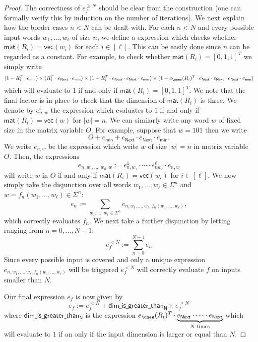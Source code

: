 \begin{proof}
The correctness of $e_f^{\geq N}$ should be clear from the construction (one can formally verify this by
induction on the number of iterations). We next explain how the border cases $n<N$ can be dealt with.
For each $n<N$ and every possible input words
$w_1,\ldots,w_\ell$ of size $n$, we define a \langfor expression which checks whether
$\mathsf{mat}(R_i)=\mathsf{vec}(w_i)$ for each $i\in[\ell]$. This can be easily done since $n$ 
can be regarded as a constant. For example, to check whether $\mathsf{mat}(R_i)=[0,1,1]^T$ we simply write
$$
(1- R_i^T\cdot e_{\mathsf{min}})\times (R_i^T\cdot e_{\mathsf{Next}}\cdot e_{\mathsf{min}})\times (1- R_i^T\cdot e_{\mathsf{Next}}\cdot e_{\mathsf{Next}}\cdot e_{\mathsf{min}})\times (1- e_{\ones}(R_i)^T\cdot e_{\mathsf{Next}}\cdot e_{\mathsf{Next}}\cdot e_{\mathsf{Next}}\cdot e_{\mathsf{min}})
$$
which will evaluate to $1$ if and only if $\mathsf{mat}(R_i)=[0,1,1]^T$. We note that the final factor is in 
place to check that the dimension of $\mathsf{mat}(R_i)$ is three.
  We denote by
$e_{n,w}^i$ the expression which evaluates to $1$ if and only if $\mathsf{mat}(R_i)=\mathsf{vec}(w)$
for $|w|=n$.
We can similarly
write any word $w$ of fixed size in the matrix variable $O$. For example, suppose that $w=101$
then we write 
$$
O+ e_{\mathsf{min}}+  e_{\mathsf{Next}}\cdot e_{\mathsf{Next}}\cdot e_{\mathsf{min}}.
$$
We write $e_{n,w}$ be the expression which write $w$ of size $|w|=n$ in matrix variable $O$.
Then, the expressions
$$
e_{n,w_1,\ldots,w_n,w}:=e_{n,w_1}^1\cdot\cdots\cdot e_{nw_{\ell}}^\ell\cdot e_{n,w}
$$
will write $w$ in $O$ if and only if $\mathsf{mat}(R_i)=\mathsf{vec}(w_i)$ for $i\in[\ell]$.
We now simply take the disjunction over all words 
$w_1,\ldots,w_\ell\in\Sigma^n$ and $w=f_n(w_1,\ldots,w_\ell)\in\Sigma^n$:
$$
e_n:=\sum_{w_1,\ldots,w_\ell\in\Sigma^n} e_{n,w_1,\ldots,w_\ell,f_n(w_1,\ldots,w_\ell)},
$$
which correctly evaluates $f_n$. We next take a further disjunction by letting ranging from 
$n=0,\ldots, N-1$:
$$
e_f^{<N}:=\sum_{n=0}^{N-1} e_n
$$
Since every possible input is covered and only a unique expression 
$ e_{n,w_1,\ldots,w_\ell,f_n(w_1,\ldots,w_\ell)}$ will be triggered $e_f^{<N}$ will correctly
evaluate $f$ on inputs smaller than $N$.

Our final expression $e_f$ is now given by
$$
e_f:=e_f^{<N} + \mathsf{dim\_is\_greater\_than_N}\times e_f^{\geq N}
$$
where $\mathsf{dim\_is\_greater\_than_N}$ is the expression
$e_{\ones}(R_i)^T\cdot\underbrace{e_{\mathsf{Next}}\cdot\cdots\cdot e_{\mathsf{Next}}}_{\text{$N$ times}}$ 
which will evaluate to $1$ if an only if the input dimension is larger or equal than $N$.
\end{proof}

